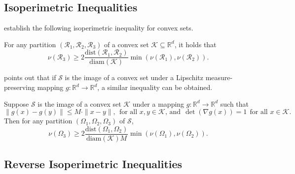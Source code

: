 \documentclass[twoside,11pt]{article}
\newcommand{\Reals}{\mathbb{R}}
\newcommand{\1}{\mathbf{1}}
\newcommand{\Rd}{\Reals^d}
\newcommand{\mc}[1]{\mathcal{#1}}
\newcommand{\diam}{\mathrm{diam}}
\begin{document}
\subsection{Isoperimetric Inequalities}
\label{subsec:isoperimetric_inequalities}
\citet{dyer1991b} establish the following isoperimetric inequality for convex sets.
\begin{lemma}
	\label{lem:convex_isoperimetric_inequality}
	For any partition $(\mc{R}_1,\mc{R}_2,\mc{R}_3)$ of a convex set $\mc{K} \subseteq \Rd$, it holds that
	\begin{equation*}
	\nu(\mc{R}_3) \geq 2\frac{\mathrm{dist}(\mc{R}_1, \mc{R}_2)}{\mathrm{diam}(\mc{K})} \min(\nu(\mc{R}_1), \nu(\mc{R}_2)).
	\end{equation*}
\end{lemma}
\citet{abbasi-yadkori2016a} points out that if $\mc{S}$ is the image of a convex set under a Lipschitz measure-preserving mapping $g: \Rd \to \Rd$, a similar inequality can be obtained.
\begin{corollary}
	\label{cor:nonconvex_isoperimetric_inequality}
	Suppose $\mc{S}$ is the image of a convex set $\mathcal{K}$ under a mapping $g:\Rd \to \Rd$ such that
	\begin{equation*}
	\|g(x) - g(y)\| \leq M \cdot \|x - y\|,~~\textrm{for all $x,y \in \mc{K}$, and}~~\det(\nabla g(x)) = 1~~\textrm{for all $x \in \mc{K}$.}
	\end{equation*}
	Then for any partition $(\Omega_1,\Omega_2,\Omega_3)$ of $\mc{S}$, 
	\begin{equation*}
	\nu(\Omega_3) \geq 2\frac{\mathrm{dist}(\Omega_1, \Omega_2)}{\diam(\mc{K}) M} \min(\nu(\Omega_1), \nu(\Omega_2)).
	\end{equation*}
\end{corollary}

\subsection{Reverse Isoperimetric Inequalities}
\label{subsec:reverse_isoperimetric_inequalities}
\end{document}
